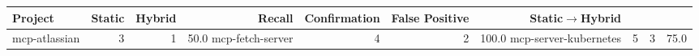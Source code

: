 \begin{tabular}{lrrrrrr}
\toprule
Project & Static & Hybrid & Recall & Confirmation & False Positive & Static$\rightarrow$Hybrid \\
\midrule
mcp-atlassian & 3 & 1 & 50.0%
mcp-fetch-server & 4 & 2 & 100.0%
mcp-server-kubernetes & 5 & 3 & 75.0%
\bottomrule
\end{tabular}
